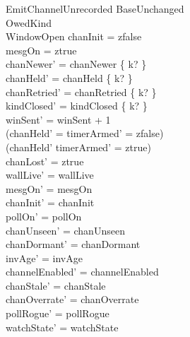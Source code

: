 \documentclass[a4paper,10pt,fleqn]{article}
\begin{document}
\begin{schema}{EmitChannelUnrecorded}
  BaseUnchanged \\
  OwedKind \\
  WindowOpen
  \where
  chanInit = zfalse \\
  mesgOn = ztrue \\
  chanNewer' = chanNewer \setminus \{ k? \} \\
  chanHeld' = chanHeld \setminus \{ k? \} \\
  chanRetried' = chanRetried \setminus \{ k? \} \\
  kindClosed' = kindClosed \cup \{ k? \} \\
  winSent' = winSent + 1 \\
  (chanHeld' = \emptyset \implies timerArmed' = zfalse) \\
  (chanHeld' \neq \emptyset \implies timerArmed' = ztrue) \\
  chanLost' = ztrue \\
  wallLive' = wallLive \\
  mesgOn' = mesgOn \\
  chanInit' = chanInit \\
  pollOn' = pollOn \\
  chanUnseen' = chanUnseen \\
  chanDormant' = chanDormant \\
  invAge' = invAge \\
  channelEnabled' = channelEnabled \\
  chanStale' = chanStale \\
  chanOverrate' = chanOverrate \\
  pollRogue' = pollRogue \\
  watchState' = watchState
\end{schema}
\end{document}
